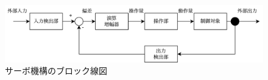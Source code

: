 \begin{figure}
    \centering
    \includegraphics[width=0.8\linewidth]{src/figures/servo-block-line/servo-block-line.png}
    \caption{サーボ機構のブロック線図}\label{fig:servo-block-line}
\end{figure}
